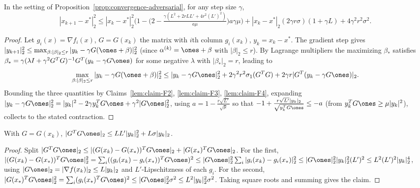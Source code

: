 \begin{lemma}
  \label{lem:adversarial-contraction}
  In the setting of Proposition~\ref{prop:convergence-adversarial}, for any step
  size $\gamma$,
  \[
    |x_{k+1} - x^*|_2^2 \le |x_k - x^*|_2^2\Big(1 - \big(2 - \tfrac{\gamma(L^2 + 2rLL' + 4r^2(L')^2)}{a\mu}\big)a\gamma\mu\Big)
      + |x_k - x^*|_2(2\gamma r\sigma)(1 + \gamma L) + 4\gamma^2 r^2\sigma^2 .
  \]
\end{lemma}
\begin{proof}
  Let $g_i(x) = \nabla f_i(x)$, $G = G(x_k)$ the matrix with $i$th column
  $g_i(x_k)$, $y_k = x_k - x^*$. The gradient step gives
  $|y_{k+1}|_2^2 \le \max_{\beta : |\beta|_2 \le r}|y_k - \gamma G(\ones + \beta)|_2^2$
  (since $\alpha^{(k)} = \ones + \beta$ with $|\beta|_2 \le r$). By Lagrange
  multipliers the maximizing $\beta_*$ satisfies
  $\beta_* = \gamma(\lambda I + \gamma^2 G^TG)^{-1}G^T(y_k - \gamma G\ones)$ for
  some negative $\lambda$ with $|\beta_*|_2 = r$, leading to
  \[
    \max_{\beta : |\beta|_2 \le r}|y_k - \gamma G(\ones+\beta)|_2^2
      \le |y_k - \gamma G\ones|_2^2 + 2\gamma^2 r^2\sigma_1(G^TG)
        + 2\gamma r|G^T(y_k - \gamma G\ones)|_2 .
  \]
  Bounding the three quantities by Claims~\ref{lem:claim-F2},
  \ref{lem:claim-F3}, \ref{lem:claim-F4}, expanding
  $|y_k - \gamma G\ones|_2^2 = |y_k|^2 - 2\gamma y_k^T G\ones + \gamma^2|G\ones|_2^2$,
  using $a = 1 - \tfrac{r\sqrt{L'}}{\sqrt\mu}$ so that
  $-1 + \tfrac{r\sqrt{L'}|y_k|_2}{\sqrt{y_k^T G\ones}} \le -a$ (from
  $y_k^T G\ones \ge \mu|y_k|^2$), collects to the stated contraction.
\end{proof}

\begin{lemma}
  \label{lem:claim-F2}
  With $G = G(x_k)$, $|G^TG\ones|_2 \le LL'|y_k|_2^2 + L\sigma|y_k|_2$.
\end{lemma}
\begin{proof}
  Split $|G^TG\ones|_2 \le |(G(x_k) - G(x_*))^TG\ones|_2 + |G(x_*)^TG\ones|_2$.
  For the first,
  $|(G(x_k) - G(x_*))^TG\ones|_2^2 = \sum_i((g_i(x_k) - g_i(x_*))^T G\ones)^2
   \le |G\ones|_2^2\sum_i|g_i(x_k) - g_i(x_*)|_2^2 \le |G\ones|_2^2|y_k|_2^2(L')^2
   \le L^2(L')^2|y_k|_2^4$, using $|G\ones|_2 = |\nabla f(x_k)|_2 \le L|y_k|_2$ and
  $L'$-Lipschitzness of each $g_i$. For the second,
  $|G(x_*)^TG\ones|_2^2 = \sum_i(g_i(x_*)^TG\ones)^2 \le |G\ones|_2^2\sigma^2
   \le L^2|y_k|_2^2\sigma^2$. Taking square roots and summing gives the claim.
\end{proof}

